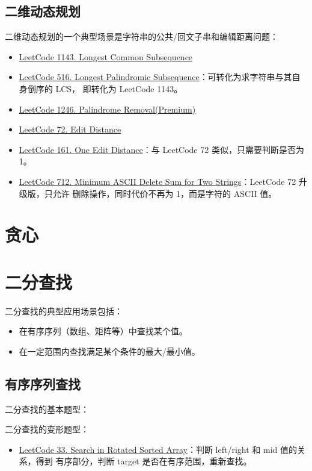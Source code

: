 \subsection{二维动态规划}
二维动态规划的一个典型场景是字符串的公共/回文子串和编辑距离问题：
\begin{itemize}
  \item
    \href{https://leetcode.com/problems/longest-common-subsequence/}{LeetCode 1143. Longest Common Subsequence}
  \item
    \href{https://leetcode.com/problems/longest-palindromic-subsequence/}{LeetCode
      516. Longest Palindromic Subsequence}：可转化为求字符串与其自身倒序的 LCS，
    即转化为 LeetCode 1143。
  \item
    \href{https://leetcode.com/problems/palindrome-removal/}{LeetCode 1246. Palindrome Removal(Premium)}
  \item
    \href{https://leetcode.com/problems/edit-distance/}{LeetCode 72. Edit Distance}
  \item
    \href{https://leetcode.com/problems/one-edit-distance}{LeetCode 161. One
      Edit Distance}：与 LeetCode 72 类似，只需要判断是否为 1。
  \item
    \href{https://leetcode.com/problems/minimum-ascii-delete-sum-for-two-strings/}{LeetCode
      712. Minimum ASCII Delete Sum for Two Strings}：LeetCode 72 升级版，只允许
    删除操作，同时代价不再为 1，而是字符的 ASCII 值。
\end{itemize}

\section{贪心}

\section{二分查找}
二分查找的典型应用场景包括：

\begin{itemize}
  \item 在有序序列（数组、矩阵等）中查找某个值。
  \item 在一定范围内查找满足某个条件的最大/最小值。
\end{itemize}

\subsection{有序序列查找}
二分查找的基本题型：

二分查找的变形题型：
\begin{itemize}
  \item
    \href{https://leetcode.com/problems/search-in-rotated-sorted-array/}{LeetCode
      33. Search in Rotated Sorted Array}：判断 left/right 和 mid 值的关系，得到
    有序部分，判断 target 是否在有序范围，重新查找。
\end{itemize}

